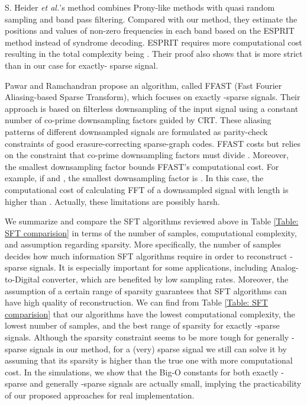 \documentclass[journal,onecolumn,11pt]{IEEEtran}
\begin{document}
S. Heider {\em et al.}'s method \cite{Heider2013} combines Prony-like methods with quasi random sampling and band pass filtering.
Compared with our method, they estimate the positions and values of non-zero frequencies in each band based on the ESPRIT method instead of syndrome decoding.
ESPRIT requires more computational cost resulting in the total complexity being .
Their proof also shows  that is more strict than  in our case for exactly- sparse signal.

Pawar and Ramchandran \cite{Pawar2013} propose an algorithm, called FFAST (Fast Fourier Aliasing-based Sparse Transform), which focuses on exactly -sparse signals.
Their approach is based on filterless downsampling of the input signal using a constant number of co-prime downsampling factors guided by CRT.
These aliasing patterns of different downsampled signals are formulated as parity-check constraints of good erasure-correcting sparse-graph codes.
FFAST costs  but relies on the constraint that co-prime downsampling factors must divide .
Moreover, the smallest downsampling factor bounds FFAST's computational cost.
For example, if  and , the smallest downsampling factor is .
In this case, the computational cost of calculating FFT of a downsampled signal with length  is higher than .
Actually, these limitations are possibly harsh.


We summarize and compare the SFT algorithms reviewed above in Table \ref{Table: SFT comparision} in terms of the number of samples, computational complexity, and assumption regarding sparsity.
More specifically, the number of samples decides how much information SFT algorithms require in order to reconstruct -sparse signals.
It is especially important for some applications, including Analog-to-Digital converter, which are benefited by low sampling rates.
Moreover, the assumption of a certain range of sparsity guarantees that SFT algorithms can have high quality of reconstruction.
We can find from Table \ref{Table: SFT comparision} that our algorithms have the lowest computational complexity, the lowest number of samples, and the best range of sparsity for exactly -sparse signals.
Although the sparsity constraint  seems to be more tough for generally -sparse signals in our method,
for a (very) sparse signal we still can solve it by assuming that its sparsity is higher than the true one with more computational cost.
In the simulations, we show that the Big-O constants for both exactly -sparse and generally -sparse signals are actually small, implying the practicability of our proposed approaches for real implementation.
\end{document}
